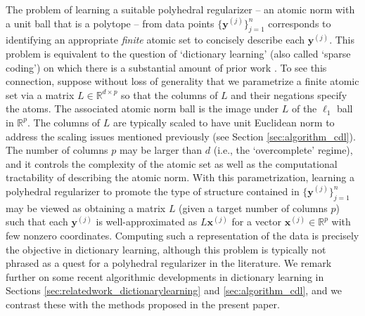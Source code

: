 \documentclass[11pt,letterpaper]{article}
\newcommand{\R}{\mathbb{R}}
\newcommand{\bx}{\mathbf{x}}
\newcommand{\by}{\mathbf{y}}
\begin{document}


The problem of learning a suitable polyhedral regularizer -- an atomic norm with a unit ball that is a polytope -- from data points $\{\by^{(j)}\}_{j=1}^n$ corresponds to identifying an appropriate \emph{finite} atomic set to concisely describe each $\by^{(j)}$.  This problem is equivalent to the question of `dictionary learning' (also called `sparse coding') on which there is a substantial amount of prior work \cite{AAJN:16,AAN:17,AEB:06,AGTM:15,AGM:14,BKS:15,OlsFie:96,SWW:12,SQW:16a,SQW:16b}.  To see this connection, suppose without loss of generality that we parametrize a finite atomic set via a matrix $L \in \R^{d \times p}$ so that the columns of $L$ and their negations specify the atoms.  The associated atomic norm ball is the image under $L$ of the $\ell_1$ ball in $\R^p$.  The columns of $L$ are typically scaled to have unit Euclidean norm to address the scaling issues mentioned previously (see Section \ref{sec:algorithm_cdl}).  The number of columns $p$ may be larger than $d$ (i.e., the `overcomplete' regime), and it controls the complexity of the atomic set as well as the computational tractability of describing the atomic norm.  With this parametrization, learning a polyhedral regularizer to promote the type of structure contained in $\{\by^{(j)}\}_{j=1}^n$ may be viewed as obtaining a matrix $L$ (given a target number of columns $p$) such that each $\by^{(j)}$ is well-approximated as $L \bx^{(j)}$ for a vector $\bx^{(j)} \in \R^p$ with few nonzero coordinates. Computing such a representation of the data is precisely the objective in dictionary learning, although this problem is typically not phrased as a quest for a polyhedral regularizer in the literature.  We remark further on some recent algorithmic developments in dictionary learning in Sections \ref{sec:relatedwork_dictionarylearning} and \ref{sec:algorithm_cdl}, and we contrast these with the methods proposed in the present paper.
\end{document}
